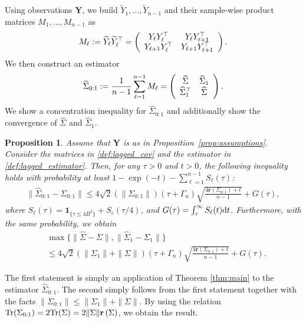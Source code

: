 \documentclass[11pt,a4paper]{article}
\newtheorem{proposition}[theorem]{Proposition}
\theoremstyle{remark}
\theoremstyle{definition}
\theoremstyle{definition}
\renewcommand{\hat}{\widehat}
\renewcommand{\tilde}{\widetilde}
\newcommand{\Surv}{S}
\newcommand{\rc}{\color{black}}
\begin{document}
\begin{bibunit}[apalike]
Using observations $\mathbf{Y}$, we build $\tilde{Y}_{1},\ldots,\tilde{Y}_{n-1}$ and their sample-wise product matrices $M_1,\ldots,M_{n-1}$ as 
$$ M_\ell :=\tilde{Y}_{\ell} \tilde{Y}_{\ell}^\top = \left(
\begin{array}{c c}
Y_{\ell} Y_\ell^\top & Y_{\ell} Y_{\ell + 1}^\top \\
Y_{\ell + 1} Y_{\ell}^\top & Y_{\ell + 1} Y_{\ell + 1}^\top
\end{array}
\right).
$$
We then construct {\rc an estimator}
\begin{align}
    \hat{\Sigma}_{0:1} := \frac{1}{n-1} \sum_{\ell=1}^{n-1} M_\ell =   \left(
\begin{array}{c c}
\hat{\Sigma} & \hat{\Sigma}_1 \\
\hat{\Sigma}_1^\top & \hat{\Sigma}
\end{array}
\right). \label{def:lagged_estimator}
\end{align}
We show a concentration inequality for $\hat{\Sigma}_{0:1}$ and additionally show the convergence of $\hat{\Sigma}$ and $\hat{\Sigma}_1$.
\begin{proposition} \label{prop:lag}
    Assume that $\mathbf{Y}$ is as in Proposition~\ref{prop:assumptions}.
    Consider the matrices in \eqref{def:lagged_cov} and the estimator in \eqref{def:lagged_estimator}.
    Then, for any $\tau>0$ and $t>0$, the following inequality holds with probability at least $1-\exp(-t)-\sum_{\ell=1}^{n-1} \Surv_\ell(\tau)$:
    \begin{align*}
    \|\hat{\Sigma}_{0:1} - \Sigma_{0:1} \|
    \le 4\sqrt{2}\left(\|\Sigma_{0:1}\|\right) \left({\tau}+\Gamma_{n}\right)\sqrt{\frac{4 \mathbf{r}\left(\Sigma_{0:1}\right) +t}{n - 1}} + G(\tau),
    \end{align*}
where $\Surv_\ell(\tau) =  \mathbf{1}_{\{\tau \leq 4B^2\}} +  \Surv_\varepsilon(\tau/4)$, and $G(\tau) = \int_{\tau}^{\infty} \Surv_\ell(t) {\rm d}t$.
    Furthermore, with the same probability, we obtain
    \begin{align*}
    &\max\{\|\hat{\Sigma}-\Sigma\|, \| \hat{\Sigma}_1 - \Sigma_1\|\}
    \\
    &\le 4\sqrt{2}\left(\|\Sigma_1\| + \|\Sigma\|\right) \left({\tau}+\Gamma_{n}\right)\sqrt{\frac{4 \mathbf{r}\left(\Sigma_{0:1}\right)  +t}{n - 1}} + G(\tau) .
\end{align*}
\end{proposition}
The first statement is simply an application of Theorem \ref{thm:main} to the estimator $\hat{\Sigma}_{0:1}$.
The second simply follows from the first statement together with the facts $\left\|\Sigma_{0:1}\right\| \leq \|\Sigma_1\| + \|\Sigma\| $. 
By using the relation $\mathrm{\rc Tr}(\Sigma_{0:1}) =2\mathrm{\rc Tr}(\Sigma) = 2 \|\Sigma\| \mathbf{r}\left(\Sigma\right)$, we obtain the result.



\end{bibunit}
\end{document}
